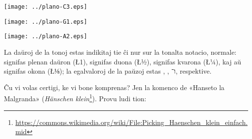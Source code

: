 \vspace{\baselineskip}
\begin{minipage}{4cm}
	\centering
	\texttt{[image: ../plano-C3.eps]}\\
\end{minipage}\hfill
\begin{minipage}{4cm}
	\centering
	\texttt{[image: ../plano-G1.eps]}\\
\end{minipage}\hfill
\begin{minipage}{4cm}
	\centering
	\texttt{[image: ../plano-A2.eps]}\\
\end{minipage}
\vspace{\baselineskip}

La daŭroj de la tonoj estas indikitaj tie ĉi nur sur la tonalta notacio, normale:  signifas plenan daŭron (\L{1}),  signifas duona (\L{½}),  signifas kvarona (\L{¼}), kaj  aŭ  signifas okona (\L{⅛}); la egalvaloroj de la paŭzoj estas , ,  ו־, respektive.

Ĉu vi volas certigi, ke vi bone komprenas? Jen la komenco de «Hanseto la Malgranda» (\emph{Hänschen klein}\footnote{\url{https://commons.wikimedia.org/wiki/File:Picking_Haenschen_klein_einfach.mid}}). Provu ludi tion:

\begin{center}
\end{center}


